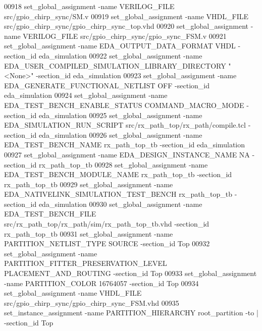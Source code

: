 \begin{DoxyCode}
00918 set\_global\_assignment -name VERILOG\_FILE src/gpio\_chirp\_sync/SM.v
00919 set\_global\_assignment -name VHDL\_FILE src/gpio\_chirp\_sync/gpio\_chirp\_sync\_top.vhd
00920 set\_global\_assignment -name VERILOG\_FILE src/gpio\_chirp\_sync/gpio\_sync\_FSM.v
00921 set\_global\_assignment -name EDA\_OUTPUT\_DATA\_FORMAT VHDL -section\_id eda\_simulation
00922 set\_global\_assignment -name EDA\_USER\_COMPILED\_SIMULATION\_LIBRARY\_DIRECTORY \textcolor{keyword}{"<None>"} -section\_id 
      eda\_simulation
00923 set\_global\_assignment -name EDA\_GENERATE\_FUNCTIONAL\_NETLIST OFF -section\_id eda\_simulation
00924 set\_global\_assignment -name EDA\_TEST\_BENCH\_ENABLE\_STATUS COMMAND\_MACRO\_MODE -section\_id eda\_simulation
00925 set\_global\_assignment -name EDA\_SIMULATION\_RUN\_SCRIPT src/rx\_path\_top/rx\_path/compile.tcl -section\_id 
      eda\_simulation
00926 set\_global\_assignment -name EDA\_TEST\_BENCH\_NAME rx\_path\_top\_tb -section\_id eda\_simulation
00927 set\_global\_assignment -name EDA\_DESIGN\_INSTANCE\_NAME NA -section\_id rx\_path\_top\_tb
00928 set\_global\_assignment -name EDA\_TEST\_BENCH\_MODULE\_NAME rx\_path\_top\_tb -section\_id rx\_path\_top\_tb
00929 set\_global\_assignment -name EDA\_NATIVELINK\_SIMULATION\_TEST\_BENCH rx\_path\_top\_tb -section\_id eda\_simulation
00930 set\_global\_assignment -name EDA\_TEST\_BENCH\_FILE src/rx\_path\_top/rx\_path/sim/rx\_path\_top\_tb.vhd -section\_id 
      rx\_path\_top\_tb
00931 set\_global\_assignment -name PARTITION\_NETLIST\_TYPE SOURCE -section\_id Top
00932 set\_global\_assignment -name PARTITION\_FITTER\_PRESERVATION\_LEVEL PLACEMENT\_AND\_ROUTING -section\_id Top
00933 set\_global\_assignment -name PARTITION\_COLOR \textcolor{vhdllogic}{16764057} -section\_id Top
00934 set\_global\_assignment -name VHDL\_FILE src/gpio\_chirp\_sync/gpio\_chirp\_sync\_FSM.vhd
00935 set\_instance\_assignment -name PARTITION\_HIERARCHY root\_partition -to | -section\_id Top
\end{DoxyCode}
